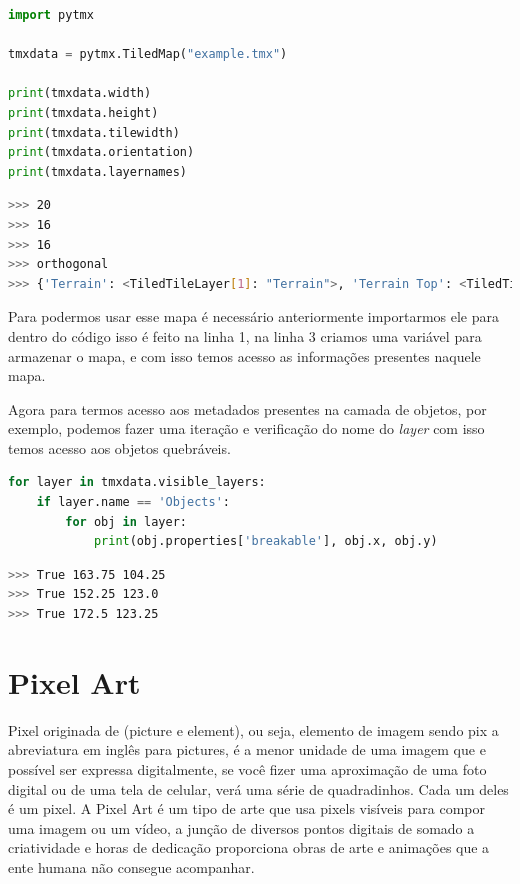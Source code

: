 \begin{lstlisting}[language=python,breaklines, caption= Uso Básico Pytmx]
import pytmx

tmxdata = pytmx.TiledMap("example.tmx")

print(tmxdata.width)
print(tmxdata.height)
print(tmxdata.tilewidth)
print(tmxdata.orientation)
print(tmxdata.layernames)
\end{lstlisting}

\begin{lstlisting}[language=bash,breaklines, caption= Saída]
>>> 20
>>> 16
>>> 16
>>> orthogonal
>>> {'Terrain': <TiledTileLayer[1]: "Terrain">, 'Terrain Top': <TiledTileLayer[2]: "Terrain Top">, 'Objects': <TiledObjectGroup[3]: "Objects">, 'Entities': <TiledObjectGroup[4]: "Entities">}
\end{lstlisting}

Para podermos usar esse mapa é necessário anteriormente importarmos ele para dentro do código isso é feito na linha 1, na linha 3 criamos uma variável para armazenar o mapa, e com isso temos acesso as informações presentes naquele mapa.

Agora para termos acesso aos metadados presentes na camada de objetos, por exemplo, podemos fazer uma iteração e verificação do nome do \textit{layer} com isso temos acesso aos objetos quebráveis.
\begin{lstlisting}[language=python,breaklines, caption= Verificação de Objetos Quebráveis]
for layer in tmxdata.visible_layers:
    if layer.name == 'Objects':
        for obj in layer:
            print(obj.properties['breakable'], obj.x, obj.y)
\end{lstlisting}

\begin{lstlisting}[language=bash,breaklines, caption= Saída]
>>> True 163.75 104.25
>>> True 152.25 123.0
>>> True 172.5 123.25
\end{lstlisting}










\section{Pixel Art}
\label{sec-pixel-art}
Pixel originada de (picture e element), ou seja, elemento de imagem sendo pix a abreviatura em inglês para pictures, é a menor unidade de uma imagem que e possível ser expressa digitalmente, se você fizer uma aproximação de uma foto digital ou de uma tela de celular, verá uma série de quadradinhos. Cada um deles é um pixel. A Pixel Art é um tipo de arte que usa pixels visíveis para compor uma imagem ou um vídeo, a junção de diversos pontos digitais de somado a criatividade e horas de dedicação proporciona obras de arte e animações que a ente humana não consegue acompanhar.

